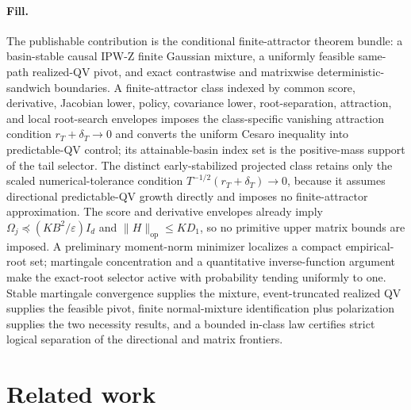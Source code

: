 \documentclass{article}
\begin{document}
\paragraph{Fill.} The publishable contribution is the conditional finite-attractor theorem bundle: a basin-stable causal IPW-Z finite Gaussian mixture, a uniformly feasible same-path realized-QV pivot, and exact contrastwise and matrixwise deterministic-sandwich boundaries. A finite-attractor class indexed by common score, derivative, Jacobian lower, policy, covariance lower, root-separation, attraction, and local root-search envelopes imposes the class-specific vanishing attraction condition \(r_T+\delta_T\to0\) and converts the uniform Cesaro inequality into predictable-QV control; its attainable-basin index set is the positive-mass support of the tail selector. The distinct early-stabilized projected class retains only the scaled numerical-tolerance condition \(T^{-1/2}(r_T+\delta_T)\to0\), because it assumes directional predictable-QV growth directly and imposes no finite-attractor approximation. The score and derivative envelopes already imply \(\Omega_j\preceq(KB^2/\varepsilon)I_d\) and \(\|H\|_{\mathrm{op}}\le KD_1\), so no primitive upper matrix bounds are imposed. A preliminary moment-norm minimizer localizes a compact empirical-root set; martingale concentration and a quantitative inverse-function argument make the exact-root selector active with probability tending uniformly to one. Stable martingale convergence supplies the mixture, event-truncated realized QV supplies the feasible pivot, finite normal-mixture identification plus polarization supplies the two necessity results, and a bounded in-class law certifies strict logical separation of the directional and matrix frontiers.

\section{Related work}
\end{document}
